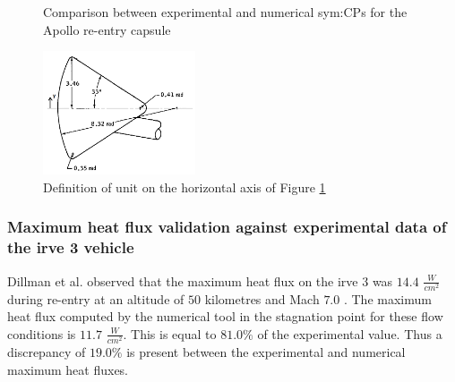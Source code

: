 \begin{figure}[H]
	\centering
	\setlength{} 
	\setlength{}
	
	\caption{Comparison between experimental and numerical \glspl{sym:CP} for the Apollo re-entry capsule}
	\label{fig:Apollo_cp}
\end{figure}

\begin{figure}[H]
	\centering
	\includegraphics[width=0.4\textwidth]{./Figure/Apollo_model}
	\caption{Definition of unit on the horizontal axis of Figure \ref{fig:Apollo_cp} \cite{Bertin1966}}
	\label{fig:Apollo_y}
\end{figure}

\subsubsection{Maximum heat flux validation against experimental data of the \gls{irve} 3 vehicle}
\label{subsubsec:heatvalidation}
Dillman et al. observed that the maximum heat flux on the \acrfull{irve} 3 was $14.4$ $\frac{W}{cm^{2}}$ during re-entry at an altitude of $50$ kilometres and Mach $7.0$ \cite{Dillman2012}. The maximum heat flux computed by the numerical tool in the stagnation point for these flow conditions is $11.7$ $\frac{W}{cm^{2}}$. This is equal to $81.0\%$ of the experimental value. Thus a discrepancy of $19.0\%$ is present between the experimental and numerical maximum heat fluxes.

